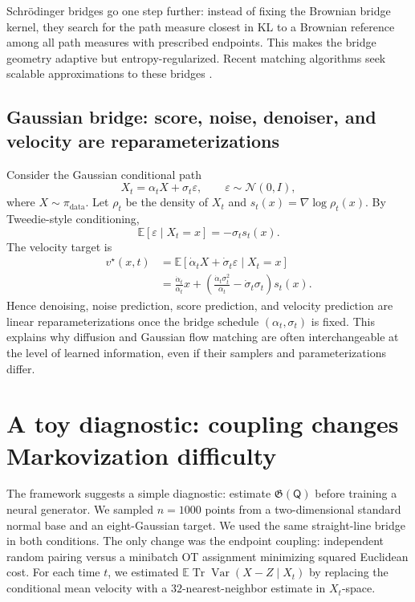\documentclass[twoside,11pt]{jmlr}
\numberwithin{equation}{section}
\newcommand{\E}{\mathbb{E}}
\newcommand{\pdata}{\pi_{\mathrm{data}}}
\newcommand{\scrQ}{\mathsf{Q}}
\newcommand{\eps}{\varepsilon}
\newcommand{\Var}{\operatorname{Var}}
\newcommand{\Tr}{\operatorname{Tr}}
\begin{document}
Schr\"odinger bridges go one step further: instead of fixing the Brownian bridge kernel, they search for the path measure closest in KL to a Brownian reference among all path measures with prescribed endpoints. This makes the bridge geometry adaptive but entropy-regularized. Recent matching algorithms seek scalable approximations to these bridges \citep{tong2024sf2m,shi2023dsbm,kim2025unified}.

\subsection{Gaussian bridge: score, noise, denoiser, and velocity are reparameterizations}

Consider the Gaussian conditional path
\begin{equation}
    X_t=\alpha_t X+\sigma_t\eps,
    \qquad \eps\sim\mathcal N(0,I),
    \label{eq:gaussian_path}
\end{equation}
where $X\sim\pdata$. Let $\rho_t$ be the density of $X_t$ and $s_t(x)=\nabla\log\rho_t(x)$. By Tweedie-style conditioning,
\begin{equation}
    \E[\eps\mid X_t=x]=-\sigma_t s_t(x).
    \label{eq:noise_score}
\end{equation}
The velocity target is
\begin{align}
    v^\star(x,t)
    &=\E[\dot \alpha_t X+\dot\sigma_t\eps\mid X_t=x]\\
    &=\frac{\dot\alpha_t}{\alpha_t}x+
    \left(\frac{\dot\alpha_t\sigma_t^2}{\alpha_t}-\dot\sigma_t\sigma_t\right)s_t(x).
    \label{eq:velocity_score_relation}
\end{align}
Hence denoising, noise prediction, score prediction, and velocity prediction are linear reparameterizations once the bridge schedule $(\alpha_t,\sigma_t)$ is fixed. This explains why diffusion and Gaussian flow matching are often interchangeable at the level of learned information, even if their samplers and parameterizations differ.

\section{A toy diagnostic: coupling changes Markovization difficulty}
\label{sec:toy}

The framework suggests a simple diagnostic: estimate $\mathfrak G(\scrQ)$ before training a neural generator. We sampled $n=1000$ points from a two-dimensional standard normal base and an eight-Gaussian target. We used the same straight-line bridge in both conditions. The only change was the endpoint coupling: independent random pairing versus a minibatch OT assignment minimizing squared Euclidean cost. For each time $t$, we estimated $\E\Tr\Var(X-Z\mid X_t)$ by replacing the conditional mean velocity with a $32$-nearest-neighbor estimate in $X_t$-space.
\end{document}
